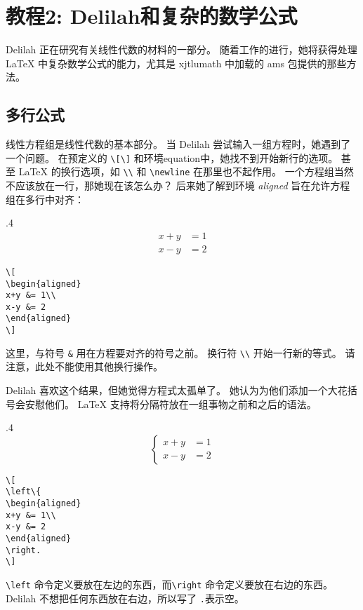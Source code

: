 \section{教程2: Delilah和复杂的数学公式}
Delilah 正在研究有关线性代数的材料的一部分。 随着工作的进行，她将获得处理 \LaTeX{} 中复杂数学公式的能力，尤其是 xjtlumath 中加载的 ams 包提供的那些方法。 

\subsection{多行公式}
线性方程组是线性代数的基本部分。 当 Delilah 尝试输入一组方程时，她遇到了一个问题。 在预定义的 \verb=\[\]= 和环境equation中，她找不到开始新行的选项。 甚至 \LaTeX{} 的换行选项，如 \verb=\\= 和 \verb=\newline= 在那里也不起作用。 一个方程组当然不应该放在一行，那她现在该怎么办？ 后来她了解到环境 \emph{aligned} 旨在允许方程组在多行中对齐：
\begin{miniexammar}{.4\textandmarginlen}{
\[
\begin{aligned}
x+y &= 1\\
x-y &= 2
\end{aligned}
\]
}
\begin{lstlisting}
\[
\begin{aligned}
x+y &= 1\\
x-y &= 2
\end{aligned}
\]
\end{lstlisting}
\end{miniexammar}

这里，与符号 \verb=&= 用在方程要对齐的符号之前。 换行符 \verb=\\= 开始一行新的等式。 请注意，此处不能使用其他换行操作。

Delilah 喜欢这个结果，但她觉得方程式太孤单了。 她认为为他们添加一个大花括号会安慰他们。 \LaTeX{} 支持将分隔符放在一组事物之前和之后的语法。
\begin{miniexammar}{.4\textandmarginlen}{
\[
\left\{
\begin{aligned}
x+y &= 1\\
x-y &= 2
\end{aligned}
\right.
\]
}
\begin{lstlisting}
\[
\left\{
\begin{aligned}
x+y &= 1\\
x-y &= 2
\end{aligned}
\right.
\]
\end{lstlisting}
\end{miniexammar}
\verb=\left= 命令定义要放在左边的东西，而\verb=\right= 命令定义要放在右边的东西。 Delilah 不想把任何东西放在右边，所以写了 \verb=.=表示空。

